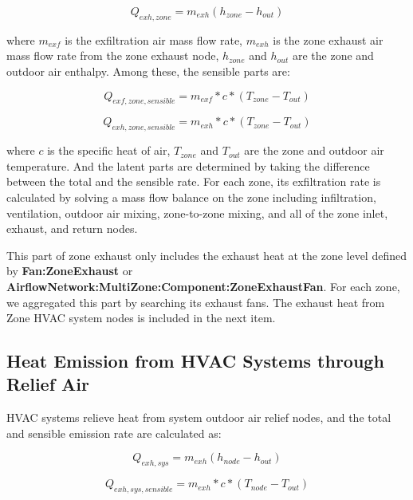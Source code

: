 \begin{equation}  \label{eq:he-3}
Q_{exh, zone} = m_{exh}(h_{zone} - h_{out})
\end{equation}

where \(m_{exf}\) is the exfiltration air mass flow rate, \(m_{exh}\) is the zone exhaust air mass flow rate from the zone exhaust node, \(h_{zone}\) and \(h_{out}\) are the zone and outdoor air enthalpy. Among these, the sensible parts are:

\begin{equation}  \label{eq:he-4}
Q_{exf, zone, sensible} = m_{exf} * c * (T_{zone} - T_{out})
\end{equation}

\begin{equation}  \label{eq:he-5}
Q_{exh, zone, sensible} = m_{exh} * c * (T_{zone} - T_{out})
\end{equation}

where \(c\) is the specific heat of air, \(T_{zone}\) and \(T_{out}\) are the zone and outdoor air temperature. And the latent parts are determined by taking the difference between the total and the sensible rate. For each zone, its exfiltration rate is calculated by solving a mass flow balance on the zone including infiltration, ventilation, outdoor air mixing, zone-to-zone mixing, and all of the zone inlet, exhaust, and return nodes.

This part of zone exhaust only includes the exhaust heat at the zone level defined by \textbf{Fan:ZoneExhaust} or \textbf{AirflowNetwork:MultiZone:Component:ZoneExhaustFan}. For each zone, we aggregated this part by searching its exhaust fans. The exhaust heat from Zone HVAC system nodes is included in the next item.

\subsection{Heat Emission from HVAC Systems through Relief Air}\label{emission-from-HVAC-relief}

HVAC systems relieve heat from system outdoor air relief nodes, and the total and sensible emission rate are calculated as:

\begin{equation}  \label{eq:he-6}
Q_{exh, sys} = m_{exh}(h_{node} - h_{out})
\end{equation}

\begin{equation}  \label{eq:he-7}
Q_{exh, sys, sensible} = m_{exh} * c * (T_{node} - T_{out})
\end{equation}

